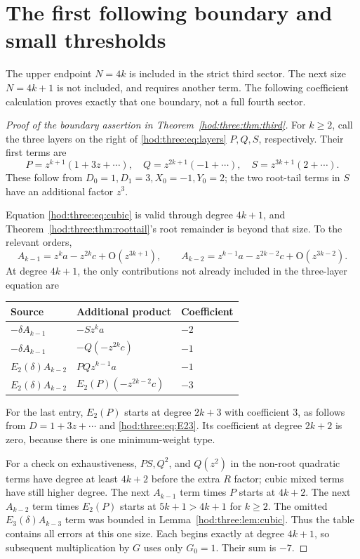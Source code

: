 \documentclass[11pt,letterpaper]{article}
\theoremstyle{definition}\newtheorem{definition}[theorem]{Definition}
\theoremstyle{remark}\newtheorem{remark}[theorem]{Remark}
\newcommand{\OO}{\mathrm O}
\begin{document}
\section{The first following boundary and small thresholds}\label{hod:three:sec:boundary}
The upper endpoint $N=4k$ is included in the strict third sector. The next size $N=4k+1$ is not included, and requires another term. The following coefficient calculation proves exactly that one boundary, not a full fourth sector.

\begin{proof}[Proof of the boundary assertion in Theorem~\ref{hod:three:thm:third}]
For $k\ge2$, call the three layers on the right of \eqref{hod:three:eq:layers} $P,Q,S$, respectively. Their first terms are
\[
P=z^{k+1}(1+3z+\cdots),\quad
Q=z^{2k+1}(-1+\cdots),\quad
S=z^{3k+1}(2+\cdots).
\]
These follow from $D_0=1,D_1=3,X_0=-1,Y_0=2$; the two root-tail terms in $S$ have an additional factor $z^3$.

Equation \eqref{hod:three:eq:cubic} is valid through degree $4k+1$, and Theorem~\ref{hod:three:thm:roottail}'s root remainder is beyond that size. To the relevant orders,
\[
A_{k-1}=z^ka-z^{2k}c+\OO(z^{3k+1}),\qquad
A_{k-2}=z^{k-1}a-z^{2k-2}c+\OO(z^{3k-2}).
\]
At degree $4k+1$, the only contributions not already included in the three-layer equation are
\begin{center}
\begin{tabular}{lll}
\toprule
Source & Additional product & Coefficient\\
\midrule
$-\delta A_{k-1}$ & $-S z^ka$ & $-2$\\
$-\delta A_{k-1}$ & $-Q(-z^{2k}c)$ & $-1$\\
$E_2(\delta)A_{k-2}$ & $PQ z^{k-1}a$ & $-1$\\
$E_2(\delta)A_{k-2}$ & $E_2(P)(-z^{2k-2}c)$ & $-3$\\
\bottomrule
\end{tabular}
\end{center}
For the last entry, $E_2(P)$ starts at degree $2k+3$ with coefficient $3$, as follows from $D=1+3z+\cdots$ and \eqref{hod:three:eq:E23}. Its coefficient at degree $2k+2$ is zero, because there is one minimum-weight type.

For a check on exhaustiveness, $PS,Q^2$, and $Q(z^2)$ in the non-root quadratic terms have degree at least $4k+2$ before the extra $R$ factor; cubic mixed terms have still higher degree. The next $A_{k-1}$ term times $P$ starts at $4k+2$. The next $A_{k-2}$ term times $E_2(P)$ starts at $5k+1>4k+1$ for $k\ge2$. The omitted $E_3(\delta)A_{k-3}$ term was bounded in Lemma~\ref{hod:three:lem:cubic}. Thus the table contains all errors at this one size. Each begins exactly at degree $4k+1$, so subsequent multiplication by $G$ uses only $G_0=1$. Their sum is $-7$.


\end{proof}
\end{document}
